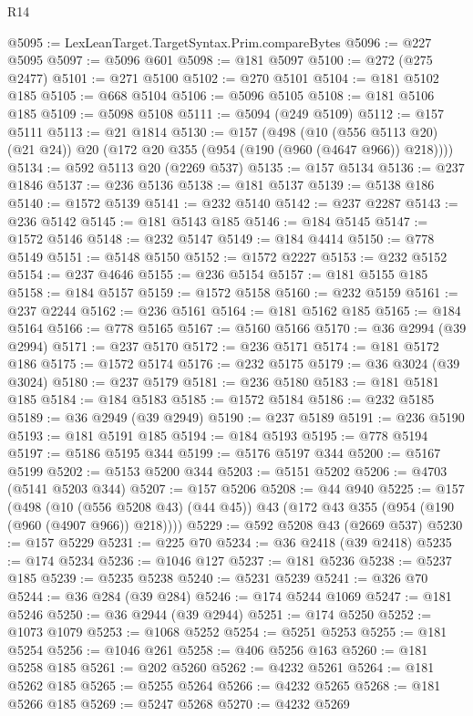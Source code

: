 \begin{lexlean}{R14}
\begin{coremodule}
@5095 := LexLeanTarget.TargetSyntax.Prim.compareBytes
@5096 := @227 @5095
@5097 := @5096 @601
@5098 := @181 @5097
@5100 := @272 (@275 @2477)
@5101 := @271 @5100
@5102 := @270 @5101
@5104 := @181 @5102 @185
@5105 := @668 @5104
@5106 := @5096 @5105
@5108 := @181 @5106 @185
@5109 := @5098 @5108
@5111 := @5094 (@249 @5109)
@5112 := @157 @5111
@5113 := @21 @1814
@5130 := @157
    (@498
      (@10 (@556 @5113 @20) (@21 @24))
      @20
      (@172 @20 @355 (@954 (@190 (@960 (@4647 @966)) @218))))
@5134 := @592 @5113 @20 (@2269 @537)
@5135 := @157 @5134
@5136 := @237 @1846
@5137 := @236 @5136
@5138 := @181 @5137
@5139 := @5138 @186
@5140 := @1572 @5139
@5141 := @232 @5140
@5142 := @237 @2287
@5143 := @236 @5142
@5145 := @181 @5143 @185
@5146 := @184 @5145
@5147 := @1572 @5146
@5148 := @232 @5147
@5149 := @184 @4414
@5150 := @778 @5149
@5151 := @5148 @5150
@5152 := @1572 @2227
@5153 := @232 @5152
@5154 := @237 @4646
@5155 := @236 @5154
@5157 := @181 @5155 @185
@5158 := @184 @5157
@5159 := @1572 @5158
@5160 := @232 @5159
@5161 := @237 @2244
@5162 := @236 @5161
@5164 := @181 @5162 @185
@5165 := @184 @5164
@5166 := @778 @5165
@5167 := @5160 @5166
@5170 := @36 @2994 (@39 @2994)
@5171 := @237 @5170
@5172 := @236 @5171
@5174 := @181 @5172 @186
@5175 := @1572 @5174
@5176 := @232 @5175
@5179 := @36 @3024 (@39 @3024)
@5180 := @237 @5179
@5181 := @236 @5180
@5183 := @181 @5181 @185
@5184 := @184 @5183
@5185 := @1572 @5184
@5186 := @232 @5185
@5189 := @36 @2949 (@39 @2949)
@5190 := @237 @5189
@5191 := @236 @5190
@5193 := @181 @5191 @185
@5194 := @184 @5193
@5195 := @778 @5194
@5197 := @5186 @5195 @344
@5199 := @5176 @5197 @344
@5200 := @5167 @5199
@5202 := @5153 @5200 @344
@5203 := @5151 @5202
@5206 := @4703 (@5141 @5203 @344)
@5207 := @157 @5206
@5208 := @44 @940
@5225 := @157
    (@498
      (@10 (@556 @5208 @43) (@44 @45))
      @43
      (@172 @43 @355 (@954 (@190 (@960 (@4907 @966)) @218))))
@5229 := @592 @5208 @43 (@2669 @537)
@5230 := @157 @5229
@5231 := @225 @70
@5234 := @36 @2418 (@39 @2418)
@5235 := @174 @5234
@5236 := @1046 @127
@5237 := @181 @5236
@5238 := @5237 @185
@5239 := @5235 @5238
@5240 := @5231 @5239
@5241 := @326 @70
@5244 := @36 @284 (@39 @284)
@5246 := @174 @5244 @1069
@5247 := @181 @5246
@5250 := @36 @2944 (@39 @2944)
@5251 := @174 @5250
@5252 := @1073 @1079
@5253 := @1068 @5252
@5254 := @5251 @5253
@5255 := @181 @5254
@5256 := @1046 @261
@5258 := @406 @5256 @163
@5260 := @181 @5258 @185
@5261 := @202 @5260
@5262 := @4232 @5261
@5264 := @181 @5262 @185
@5265 := @5255 @5264
@5266 := @4232 @5265
@5268 := @181 @5266 @185
@5269 := @5247 @5268
@5270 := @4232 @5269

\end{coremodule}
\end{lexlean}
